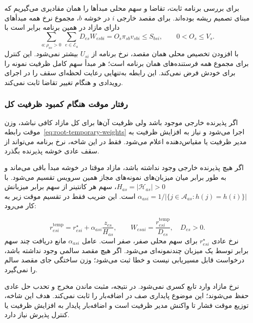 برای بررسی برنامه ثابت، تقاضا و سهم محلی مبدأها را همان مقادیری می‌گیریم که مبنای تصمیم ریشه بوده‌اند. برای مقصد خارجی $i$ در خوشه $b$، مجموع نرخ همه مبدأهای دارای مازاد در همین برنامه برابر است با
\begin{equation}
 \sum_{a:\rho_{as}>0}\ \sum_{e\in\mathcal E_a}D_{es}W_{esbi}
 =O_s\pi_{sb}v_{sbi}\leq S_{bsi},\qquad 0<O_s\leq V_s.
 \label{eq:all-sources-external-bound}
\end{equation}
با افزودن تخصیص محلی همان مقصد، نرخ برنامه از $U_{si}$ بیشتر نمی‌شود. این کنترل برای مجموع همه فرستنده‌های همان برنامه است؛ هر مبدأ سهم کامل ظرفیت نمونه را برای خودش فرض نمی‌کند. این رابطه به‌تنهایی رعایت لحظه‌ای سقف را در اجرای رویدادی و هنگام تغییر تقاضا ثابت نمی‌کند.


\subsubsection{رفتار موقت هنگام کمبود ظرفیت کل}
\label{sec:overload}

اگر پذیرنده خارجی موجود باشد ولی ظرفیت آن‌ها برای کل مازاد کافی نباشد، وزن موقت رابطه~\eqref{eq:root-temporary-weights} اجرا می‌شود و نیاز به افزایش ظرفیت به مدیر ظرفیت یا مقیاس‌دهنده اعلام می‌شود. فقط در این شاخه، نرخ برنامه می‌تواند از سقف عادی خوشه پذیرنده بگذرد.

اگر هیچ پذیرنده خارجی وجود نداشته باشد، مازاد موقتا در خوشه مبدأ باقی می‌ماند و به طور برابر میان میزبان‌های نمونه‌های مجاز همین سرویس تقسیم می‌شود. با $H_{as}=|\mathcal H_{as}|>0$، سهم هر کانتینر از سهم برابر میزبانش
$\alpha_{asi}=1/|\{j\in\mathcal A_{as}:h(j)=h(i)\}|$
است. این ضریب فقط در تقسیم موقت زیر به کار می‌رود:

\begin{equation}
 r^{\mathrm{temp}}_{esi}=r_{esi}^{\star}
                 +\alpha_{asi}\frac{z_{es}}{H_{as}},\qquad
 W_{esai}=\frac{r^{\mathrm{temp}}_{esi}}{D_{es}},\quad D_{es}>0.
 \label{eq:local-temporary}
\end{equation}
نرخ عادی $r_{esi}^{\star}$ برای سهم محلی صفر، صفر است. عامل $\alpha_{asi}$ مانع دریافت چند سهم برابر توسط یک میزبان چندنمونه‌ای می‌شود. اگر هیچ مقصد سالمی وجود نداشته باشد، درخواست قابل مسیریابی نیست و خطا ثبت می‌شود؛ وزن ساختگی جای مقصد سالم را نمی‌گیرد.

نرخ مازاد وارد تابع کسری نمی‌شود. در نتیجه، مثبت ماندن مخرج و تحدب حل عادی حفظ می‌شوند؛ این موضوع پایداری صف در اضافه‌بار را ثابت نمی‌کند. هدف این شاخه، توزیع موقت فشار تا واکنش مدیر ظرفیت است و اضافه‌بار پایدار به افزایش ظرفیت یا کنترل پذیرش نیاز دارد.

